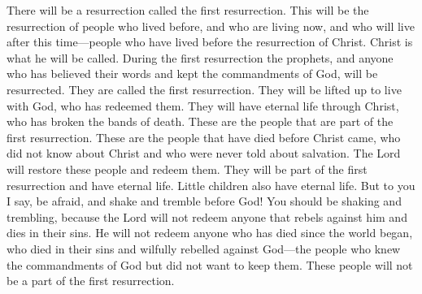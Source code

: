 \bverse \iffalse And there cometh a resurrection, even a first resurrection; yea, even a resurrection of those that have been, and who are, and who shall be, even until the resurrection of Christ--for so shall he be called. \fi
There will be a resurrection called the first resurrection. This will be the resurrection of people who lived before, and who are living now, and who will live after this time---people who have lived before the resurrection of Christ. Christ is what he will be called.
\bverse \iffalse And now, the resurrection of all the prophets, and all those that have believed in their words, or all those that have kept the commandments of God, shall come forth in the first resurrection; therefore, they are the first resurrection. \fi
During the first resurrection the prophets, and anyone who has believed their words and kept the commandments of God, will be resurrected. They are called the first resurrection.
\bverse \iffalse They are raised to dwell with God who has redeemed them; thus they have eternal life through Christ, who has broken the bands of death. \fi
They will be lifted up to live with God, who has redeemed them. They will have eternal life through Christ, who has broken the bands of death.
\bverse \iffalse And these are those who have part in the first resurrection; and these are they that have died before Christ came, in their ignorance, not having salvation declared unto them. And thus the Lord bringeth about the restoration of these; and they have a part in the first resurrection, or have eternal life, being redeemed by the Lord. \fi
These are the people that are part of the first resurrection. These are the people that have died before Christ came, who did not know about Christ and who were never told about salvation. The Lord will restore these people and redeem them. They will be part of the first resurrection and have eternal life.
\bverse \iffalse And little children also have eternal life. \fi
Little children also have eternal life.
\bverse \iffalse But behold, and fear, and tremble before God, for ye ought to tremble; for the Lord redeemeth none such that rebel against him and die in their sins; yea, even all those that have perished in their sins ever since the world began, that have wilfully rebelled against God, that have known the commandments of God, and would not keep them; these are they that have no part in the first resurrection. \fi
But to you I say, be afraid, and shake and tremble before God! You should be shaking and trembling, because the Lord will not redeem anyone that rebels against him and dies in their sins. He will not redeem anyone who has died since the world began, who died in their sins and wilfully rebelled against God---the people who knew the commandments of God but did not want to keep them. These people will not be a part of the first resurrection.
